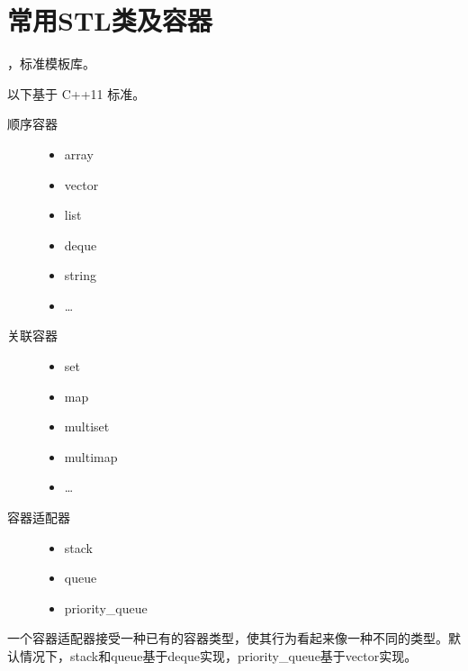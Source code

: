 \documentclass[letterpaper,10pt,english]{sphinxmanual}
\begin{document}
\section{常用STL类及容器}
\label{\detokenize{cpp/19_stl:stl}}\label{\detokenize{cpp/19_stl::doc}}
 ，标准模板库。

以下基于 C++11 标准。
\begin{description}
\item[{顺序容器}] \leavevmode\begin{itemize}
\item {} 
array

\item {} 
vector

\item {} 
list

\item {} 
deque

\item {} 
string

\item {} 
…

\end{itemize}

\item[{关联容器}] \leavevmode\begin{itemize}
\item {} 
set

\item {} 
map

\item {} 
multiset

\item {} 
multimap

\item {} 
…

\end{itemize}

\item[{容器适配器}] \leavevmode\begin{itemize}
\item {} 
stack

\item {} 
queue

\item {} 
priority\_queue

\end{itemize}

\end{description}

一个容器适配器接受一种已有的容器类型，使其行为看起来像一种不同的类型。默认情况下，stack和queue基于deque实现，priority\_queue基于vector实现。
\end{document}
